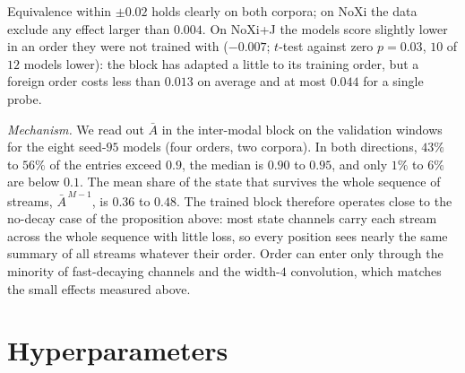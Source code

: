 \documentclass[10pt,a4paper,twocolumn]{article}
\begin{document}
	Equivalence within $\pm 0.02$ holds clearly on both corpora; on NoXi the data exclude any effect larger than $0.004$. On NoXi+J the models score slightly lower in an order they were not trained with ($-0.007$; $t$-test against zero $p = 0.03$, $10$ of $12$ models lower): the block has adapted a little to its training order, but a foreign order costs less than $0.013$ on average and at most $0.044$ for a single probe.

	\emph{Mechanism.} We read out $\bar{A}$ in the inter-modal block on the validation windows for the eight seed-$95$ models (four orders, two corpora). In both directions, $43\%$ to $56\%$ of the entries exceed $0.9$, the median is $0.90$ to $0.95$, and only $1\%$ to $6\%$ are below $0.1$. The mean share of the state that survives the whole sequence of streams, $\bar{A}^{\,M-1}$, is $0.36$ to $0.48$. The trained block therefore operates close to the no-decay case of the proposition above: most state channels carry each stream across the whole sequence with little loss, so every position sees nearly the same summary of all streams whatever their order. Order can enter only through the minority of fast-decaying channels and the width-$4$ convolution, which matches the small effects measured above.


	\newpage
	\section{Hyperparameters}
	\label{sec:hyper}
	
\end{document}

